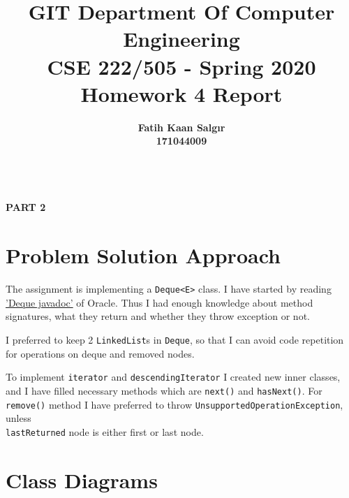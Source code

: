 \documentclass[a4paper]{article}
\title{\textbf{GIT Department Of Computer Engineering\\ 
CSE 222/505 - Spring 2020\\
Homework 4 Report \vspace{1in}}}
\author{\textbf{Fatih Kaan Salgır} \\ 
\textbf{171044009}}
\date{}
\begin{document}
\begin{large}

  \maketitle

  \newpage

  \begin{center}
    \textbf{ \\
      \vspace{3cm}
      \Huge{PART 2}
    }
  \end{center}

  \newpage


  \section{Problem Solution Approach}

  The assignment is implementing a \texttt{Deque<E>} class. I have started by reading \href{https://docs.oracle.com/javase/7/docs/api/java/util/Deque.html}{'Deque javadoc'} of Oracle. Thus I had enough knowledge about method signatures, what they return and whether they throw exception or not.

  \vspace{1em}
  I preferred to keep 2 \texttt{LinkedList}s in \texttt{Deque}, so that I can avoid code repetition for operations on deque and removed nodes.

  \vspace{1em}
  To implement \texttt{iterator} and \texttt{descendingIterator} I created new inner classes, and I have filled necessary methods which are \texttt{next()} and \texttt{hasNext()}. For \texttt{remove()} method I have preferred to throw  \texttt{UnsupportedOperationException}, unless \\\texttt{lastReturned} node is either first or last node.

  \newpage



  \section{Class Diagrams}



\end{large}
\end{document}
